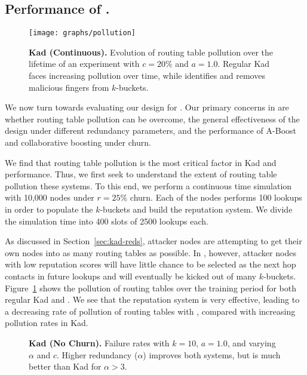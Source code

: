 \subsection{Performance of \ksys.}
\label{sec:eval-kad-perf}


\begin{figure}[t]
 \centering 
  \texttt{[image: graphs/pollution]} 
\caption{{\bf Kad (Continuous).} Evolution of routing table pollution
  over the lifetime of an experiment with $c=20\%$ and $a=1.0$. Regular
  Kad faces increasing pollution over time, while \ksys identifies and
  removes malicious fingers from $k$-buckets.}
\label{fig:kad_pollution}
\end{figure}


We now turn towards evaluating our design for \ksys. Our primary
concerns in \ksys are whether routing table pollution can be overcome,
the general effectiveness of the design under different redundancy
parameters, and the performance of A-Boost and collaborative boosting
under churn.

 We find that routing table
pollution is the most critical factor in Kad and \ksys
performance. Thus, we first seek to understand the extent of routing
table pollution these systems. To this end, we perform a continuous time
simulation with 10,000 nodes under $r=25\%$ churn. Each of the nodes
performs 100 lookups in order to populate the $k$-buckets and build the
reputation system. We divide the simulation time into 400 slots of 2500
lookups each.


As discussed in Section~\ref{sec:kad-reds}, attacker nodes are
attempting to get their own nodes into as many routing tables as
possible. In \ksys, however, attacker nodes with low reputation scores
will have little chance to be selected as the next hop contacts in
future lookups and will eventually be kicked out of many
$k$-buckets. Figure~\ref{fig:kad_pollution} shows the pollution of
routing tables over the training period for both regular Kad and
\ksys. We see that the reputation system is very effective, leading to a
decreasing rate of pollution of routing tables with \ksys, compared with
increasing pollution rates in Kad.

\begin{figure}[t!]
\centering
\caption{{\bf Kad (No Churn).} Failure rates with $k=10$, $a=1.0$, and
   varying $\alpha$ and $c$. Higher redundancy ($\alpha$) improves both
   systems, but \ksys is much better than Kad for $\alpha > 3$.}
      \label{fig:kad_f_graphs}
\end{figure}

